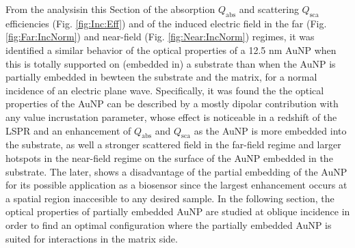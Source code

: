 From the analysisin this Section of the absorption $Q_\text{abs}$ and scattering $Q_\text{sca}$ efficiencies (Fig. \ref{fig:Inc:Eff}) and of the induced electric field in the far (Fig. \ref{fig:Far:IncNorm}) and near-field  (Fig. \ref{fig:Near:IncNorm})  regimes, it was identified a similar behavior of the optical properties of a 12.5 nm AuNP when this is totally supported on (embedded in)  a substrate  than when the AuNP is partially embedded in bewteen the substrate and the matrix, for a normal incidence of an electric plane wave. Specifically, it was found the the optical properties of the AuNP can be described by a mostly dipolar contribution with any value  incrustation parameter, whose effect is noticeable in a redshift of the LSPR and an enhancement of $Q_\text{abs}$  and $Q_\text{sca}$ as the AuNP is more embedded into the substrate, as well a stronger scattered field in the far-field regime and larger hotspots in the near-field regime on the surface of the AuNP embedded in the substrate. The later, shows a disadvantage of the partial embedding of the AuNP for its possible application as a biosensor since the largest enhancement occurs at a spatial region inaccesible to any desired sample. In the following section, the optical properties of partially embedded AuNP are studied at oblique incidence in order to find an optimal configuration where the partially embedded AuNP is suited for interactions in the matrix side.
